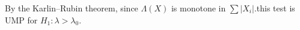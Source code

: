 \documentclass[preview]{standalone}
\begin{document}
\begin{center}
By the Karlin–Rubin theorem, since $\Lambda(X)$ is monotone in $\sum|X_i|$.this test is UMP for $H_1:\lambda>\lambda_0$.
\end{center}
\end{document}
